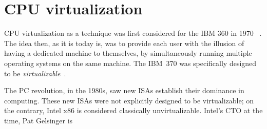 \section{CPU virtualization}
\label{sec:cpuvirt}

CPU virtualization as a technique was first considered for the IBM 360 in 1970~
\cite{meyer-virtual-machines}. The idea then, as it is today is, was to provide
each user with the illusion of having a dedicated machine to themselves, by
simultaneously running multiple operating systems on the same machine.
The IBM~370 was specifically designed to be
\emph{virtualizable}~\cite{popek-goldberg}.

The PC revolution, in the 1980s, saw new ISAs establish their dominance in
computing. These new ISAs were not explicitly designed to be virtualizable; on
the contrary, Intel x86 is considered classically unvirtualizable. Intel's CTO at the time, Pat Gelsinger is
